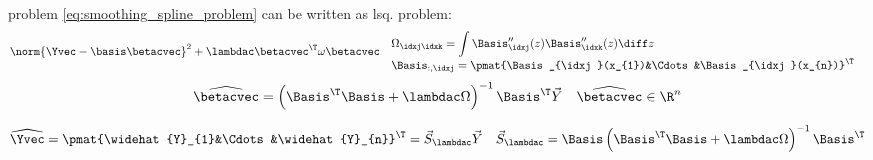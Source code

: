 \begin{corbox}\nospacing
    \begin{cor}\label{cor:smoothing_splines_solution}\leavevmode\\
        problem \cref{eq:smoothing_spline_problem} can be written as lsq. problem:
        \begin{align*}
          &\norm{\Yvec-\basis\betacvec}^{2}+\lambdac\betacvec^{\T}\omega\betacvec&&
          \begin{aligned}
              &\Omega_{\idxj\idxk}=\int\Basis_{\idxj}''(z)\Basis_{\idxk}''(z)\diff z \\[-1\jot]
              &\Basis_{:,\idxj}=\pmat{\Basis_{\idxj}(x_{1})&\Cdots&\Basis_{\idxj}(x_{n})}^{\T}
          \end{aligned}
        \end{align*}
        \begin{align}
          \widehat{\betacvec}=\left(\Basis^{\T}\Basis+\lambdac\Omega\right)^{-1}\Basis^{\T}\vec{Y}&&\widehat{\betacvec}\in\R^{n}
        \end{align}
    \end{cor}
\end{corbox}
\begin{defnbox}\nospacing
    \begin{defn}\label{defn:hat_matrix}
        \begin{align}
          \widehat{\Yvec}=\pmat{\widehat{Y}_{1}&\Cdots&\widehat{Y}_{n}}^{\T}=\vec{S}_{\lambdac}\vec{Y}&&
          \vec{S}_{\lambdac}=\Basis\left(\Basis^{\T}\Basis+\lambdac\Omega\right)^{-1}\Basis^{\T}
        \end{align}
    \end{defn}
\end{defnbox}

